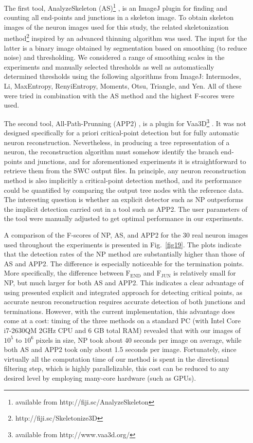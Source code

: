 The first tool, AnalyzeSkeleton (AS)\footnote{available from http://fiji.sc/AnalyzeSkeleton} \cite{arganda20103d}, is an ImageJ plugin for finding and counting all end-points and junctions in a skeleton image. To obtain skeleton images of the neuron images used for this study, the related skeletonization method\footnote{http://fiji.sc/Skeletonize3D} inspired by an advanced thinning algorithm \cite{lee1994building} was used. The input for the latter is a binary image obtained by segmentation based on smoothing (to reduce noise) and thresholding. We considered a range of smoothing scales in the experiments and manually selected thresholds as well as automatically determined thresholds using the following algorithms from ImageJ: Intermodes, Li, MaxEntropy, RenyiEntropy, Moments, Otsu, Triangle, and Yen. All of these were tried in combination with the AS method and the highest F-scores were used.

The second tool, All-Path-Prunning (APP2) \cite{xiao2013app2}, is a plugin for Vaa3D\footnote{available from http://www.vaa3d.org/} \cite{peng2010v3d, peng2014extensible}. It was not designed specifically for a priori critical-point detection but for fully automatic neuron reconstruction. Nevertheless, in producing a tree representation of a neuron, the reconstruction algorithm must somehow identify the branch end-points and junctions, and for aforementioned experiments it is straightforward to retrieve them from the SWC output files. In principle, any neuron reconstruction method is also implicitly a critical-point detection method, and its performance could be quantified by comparing the output tree nodes with the reference data. The interesting question is whether an explicit detector such as NP outperforms the implicit detection carried out in a tool such as APP2. The user parameters of the tool were manually adjusted to get optimal performance in our experiments.

A comparison of the F-scores of NP, AS, and APP2 for the 30 real neuron images used throughout the experiments is presented in Fig.~\ref{fig19}. The plots indicate that the detection rates of the NP method are substantially higher than those of AS and APP2. The difference is especially noticeable for the termination points. More specifically, the difference between $\textrm{F}_{\textrm{END}}$ and $\textrm{F}_{\textrm{JUN}}$ is relatively small for NP, but much larger for both AS and APP2. This indicates a clear advantage of using presented explicit and integrated approach for detecting critical points, as accurate neuron reconstruction requires accurate detection of both junctions and terminations. However, with the current implementation, this advantage does come at a cost: timing of the three methods on a standard PC (with Intel Core i7-2630QM 2GHz CPU and 6 GB total RAM) revealed that with our images of $10^5$ to $10^6$ pixels in size, NP took about 40 seconds per image on average, while both AS and APP2 took only about 1.5 seconds per image. Fortunately, since virtually all the computation time of our method is spent in the directional filtering step, which is highly parallelizable, this cost can be reduced to any desired level by employing many-core hardware (such as GPUs).
